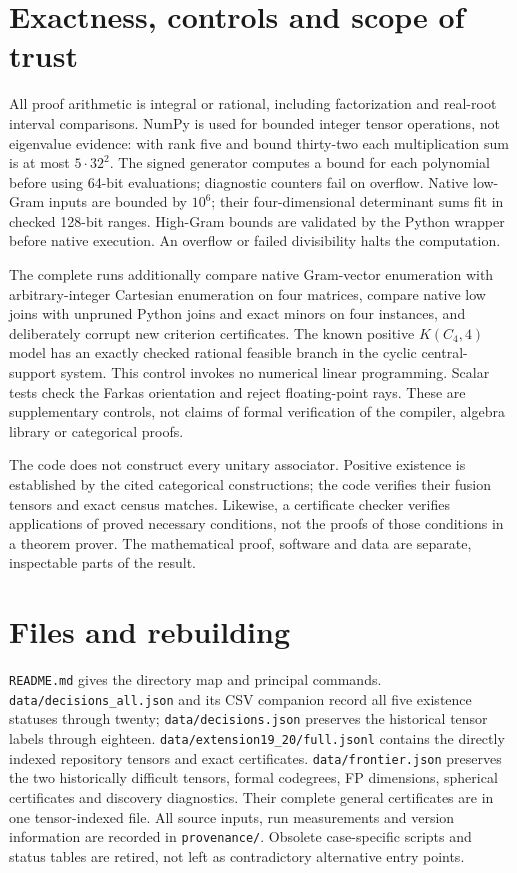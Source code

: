 \documentclass[11pt]{article}
\begin{document}
\section{Exactness, controls and scope of trust}
All proof arithmetic is integral or rational, including factorization
and real-root interval comparisons. NumPy is used for bounded integer
tensor operations, not eigenvalue evidence: with rank five and bound
thirty-two each multiplication sum is at most $5\cdot32^2$.
The signed generator computes a bound for each polynomial before using
64-bit evaluations; diagnostic counters fail on overflow.
Native low-Gram inputs are bounded by $10^6$; their
four-dimensional determinant sums fit in checked 128-bit ranges.
High-Gram bounds are validated by the Python wrapper before native
execution. An overflow or failed divisibility halts the computation.

The complete runs additionally compare native Gram-vector enumeration
with arbitrary-integer Cartesian enumeration on four matrices, compare
native low joins with unpruned Python joins and exact minors on four
instances, and deliberately corrupt new
criterion certificates. The known positive $K(C_4,4)$ model has an exactly checked rational
feasible branch in the cyclic central-support system. This control invokes
no numerical linear programming. Scalar tests check the Farkas
orientation and reject floating-point rays. These are supplementary
controls, not claims of formal verification of the compiler, algebra
library or categorical proofs.

The code does not construct every unitary associator. Positive existence
is established by the cited categorical constructions; the code verifies
their fusion tensors and exact census matches. Likewise, a certificate
checker verifies applications of proved necessary conditions, not the
proofs of those conditions in a theorem prover. The mathematical proof,
software and data are separate, inspectable parts of the result.

\section{Files and rebuilding}
\texttt{README.md} gives the directory map and principal commands.
\texttt{data/decisions\_all.json} and its CSV companion record all five
existence statuses through twenty; \texttt{data/decisions.json} preserves
the historical tensor labels through eighteen.
\texttt{data/extension19\_20/full.jsonl} contains the directly indexed
repository tensors and exact certificates.
\texttt{data/frontier.json} preserves the two historically difficult tensors,
formal codegrees, FP dimensions, spherical certificates and discovery
diagnostics. Their complete general certificates are in one tensor-indexed
file. All source inputs, run measurements and version information are
recorded in \texttt{provenance/}. Obsolete case-specific scripts and
status tables are retired, not left as contradictory alternative entry
points.
\end{document}
